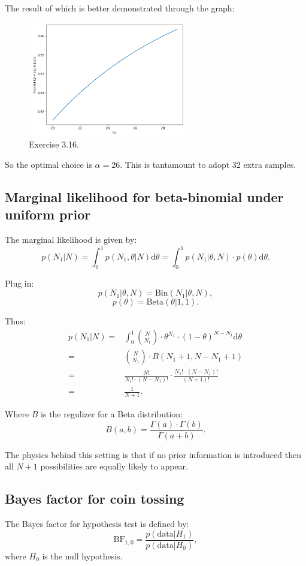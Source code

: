 \documentclass[UTF8]{ctexart}
\begin{document}
The result of which is better demonstrated through the graph:
\begin{figure}[htbp]
\centering
\includegraphics[width=7cm,height=5cm]{./figures/3-16.png}
\caption{Exercise 3.16.}
\end{figure}
So the optimal choice is $\alpha=26$.
This is tantamount to adopt 32 extra samples.

\subsection{Marginal likelihood for beta-binomial under uniform prior}
The marginal likelihood is given by:
$$p(N_{1}|N)=\int_{0}^{1} p(N_{1},\theta|N) \text{d}\theta = \int_{0}^{1} p(N_{1}|\theta,N)\cdot p(\theta)\text{d}\theta.$$

Plug in:
$$p(N_{1}|\theta,N)=\text{Bin}(N_{1}|\theta,N),$$
$$p(\theta) = \text{Beta}(\theta|1,1).$$

Thus:
\begin{align}
p(N_{1}|N)=&\int_{0}^{1} \binom{N}{N_{1}}\cdot \theta^{N_{1}}\cdot (1-\theta)^{N-N_{1}} \text{d}\theta \nonumber \\
=&\binom{N}{N_{1}}\cdot B(N_{1} +1,N-N_{1}+1)\nonumber \\
=&\frac{N!}{N_{1}!\cdot (N-N_{1})!}\cdot\frac{N_{1}! \cdot(N-N_{1})!}{(N+1)!}\nonumber \\
=&\frac{1}{N+1}. \nonumber
\end{align}

Where $B$ is the regulizer for a Beta distribution:
$$B(a,b)=\frac{\Gamma(a)\cdot\Gamma(b)}{\Gamma(a+b)}.$$

The physics behind this setting is that if no prior information is introduced then all $N+1$ possibilities are equally likely to appear.

\subsection{Bayes factor for coin tossing}
The Bayes factor for hypothesis test is defined by:
$$\text{BF}_{1,0}=\frac{p(\text{data}|H_{1})}{p(\text{data}|H_{0})},$$
where $H_{0}$ is the null hypothesis.
\end{document}
